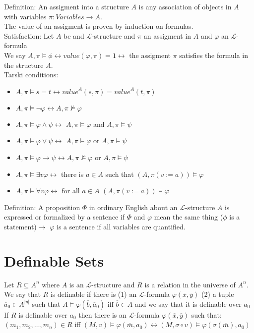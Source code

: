 \documentclass[10pt]{article}
\begin{document}
Definition: An assigment into a structure $A$ is any association of objects in $A$ with variables $\pi:Variables\rightarrow A$.\\
The value of an assigment is proven by induction on formulas.\\
Satisfaction: Let $A$ be and $\mathcal{L}$-structure and $\pi$ an assigment in $A$ and $\varphi$ an $\mathcal{L}$-formula\\
We say $A,\pi\models\phi\leftrightarrow value(\varphi,\pi)=1\leftrightarrow$ the assigment $\pi$ satisfies the formula in the structure $A$.\\
Tarski conditions:
\begin{itemize}
    \item $A,\pi\models s=t\leftrightarrow {value}^A(s,\pi)={value}^A(t,\pi)$
    \item $A,\pi\models \lnot\varphi\leftrightarrow A,\pi\not\models \varphi$
    \item $A,\pi\models\varphi\land\psi\leftrightarrow$ $A,\pi\models\varphi$ and $A,\pi\models\psi$
    \item $A,\pi\models\varphi\lor\psi\leftrightarrow$ $A,\pi\models\varphi$ or $A,\pi\models\psi$
    \item $A,\pi\models\varphi\rightarrow\psi\leftrightarrow$$A,\pi\not\models\varphi$ or $A,\pi\models\psi$
    \item $A,\pi\models\exists v\varphi\leftrightarrow$ there is $a\in A$ such that $(A,\pi(v:=a))\models\varphi$
    \item $A,\pi\models\forall v\varphi\leftrightarrow$ for all $a\in A$ $(A,\pi(v:=a))\models\varphi$
\end{itemize}
Definition: A proposition $\Phi$ in ordinary English about an $\mathcal{L}$-structure $A$ is expressed or formalized by a sentence if $\Phi$ and $\varphi$ mean the same thing ($\phi$ is a statement)$\rightarrow$ $\varphi$ is a sentence if all variables are quantified.
\section*{Definable Sets}
Let $R\subseteq A^n$ where $A$ is an $\mathcal{L}$-structure and $R$ is a relation in the universe of $A^n$. We say that $R$ is definable if there is (1) an $\mathcal{L}$-formula $\varphi(\overline{x},\overline{y})$ (2) a tuple $\overline{a}_0\in A^{\lvert\overline{y}\rvert}$ such that $A\models \varphi(\overline{b},\overline{a}_0)$ iff $\overline{b}\in A$ and we say that it is definable over $a_0$\\
If $R$ is definable over $a_0$ then there is an $\mathcal{L}$-formula $\varphi(\overline{x},\overline{y})$ such that:\\ 
$(m_1,m_2,\ldots,m_n)\in R$ iff $(M,v)\models\varphi(\overline{m},a_0)\leftrightarrow(M,\sigma\circ v)\models\varphi(\sigma(\overline{m}),a_0)$
\end{document}
